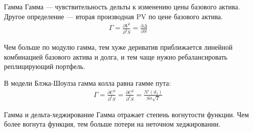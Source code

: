 \documentclass{beamer}
\begin{document}
\begin{frame}{Гамма}
\justify
Гамма --- чувствительность дельты к изменению цены базового актива. Другое определение --- вторая производная PV по цене базового актива.
\begin{align*}
\Gamma = \frac{\partial V^2}{\partial^2 S} = \frac{\partial \Delta}{\partial S}
\end{align*}

\justify
Чем больше по модулю гамма, тем хуже дериватив приближается линейной комбинацией базового актива и долга, и тем чаще нужно ребалансировать реплицирующий портфель.

\justify
В модели Блэка-Шоулза гамма колла равна гамме пута:
\begin{align*}
\Gamma = \frac{\partial C^2}{\partial^2 S} = \frac{\partial C^2}{\partial^2 S} =
\frac{N'(d_1)}{S\sigma\sqrt{T}} 
\end{align*} 
\end{frame}



\begin{frame}{Гамма и дельта-хеджирование}
\justify
Гамма отражает степень вогнутости функции. Чем более вогнута функция, тем больше потери на неточном хеджировании.

\centering
{}
\end{frame}
\end{document}
